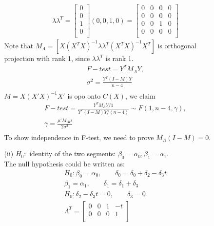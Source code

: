 \begin{itemize}
\begin{itemize}
\[\begin{split}
    \lambda \lambda^T = \begin{bmatrix}
           0 \\
           0\\
           1\\
           0\\
         \end{bmatrix} (0,0,1,0) = \begin{bmatrix}
           0 & 0& 0 & 0 \\
           0 & 0& 0 & 0\\
           0 & 0 & 1 & 0\\
           0 & 0& 0 & 0 \\
         \end{bmatrix} 
    \end{split}
    \]
    Note that $M_{\Lambda} = [X (X^TX)^{-1} \lambda \lambda^T (X^TX)^{-1}X^T]$ is orthogonal projection with rank 1, since $\lambda \lambda^T$ is rank 1.
    \[ 
    \begin{split}
    F-test = Y^T M_{\Lambda} Y,\\
    \sigma^2 = \frac{Y^T (I-M) Y}{n-4}\\
    \end{split}
    \] 
    $M= X(X'X)^{-1}X'$ is opo onto $C(X)$, we claim\\
     \[ 
    \begin{split}
    F-test =\frac{Y^T M_{\Lambda} Y/1}{Y^T (I-M) Y/(n-4)} \sim F(1, n-4, \gamma) ,\\
    \gamma = \frac{\mu' M_{\Lambda} \mu}{2\sigma^2} \\
    \end{split}
    \]    
    To show independence in F-test, we need to prove $M_{\Lambda} (I-M) = 0$.\\
    \item[(ii)] $H_0:$ identity of the two segments: $\beta_0 = \alpha_0, \beta_1 = \alpha_1$. \\
    The null hypothesis could be written as:
    \[ 
    \begin{split}
    H_0: \beta_0 = \alpha_0, \qquad \delta_0 = \delta_0 + \delta_2 - \delta_3t\\
    \beta_1 = \alpha_1, \qquad \delta_1 = \delta_1+\delta_3\\
    H_0: \delta_2 - \delta_3t= 0,\qquad \delta_3 = 0\\
    \Lambda^T = \begin{bmatrix}
           0 & 0& 1 & -t \\
           0 & 0& 0 & 1\\

\end{bmatrix}
\end{split}\]
\end{itemize}
\end{itemize}
